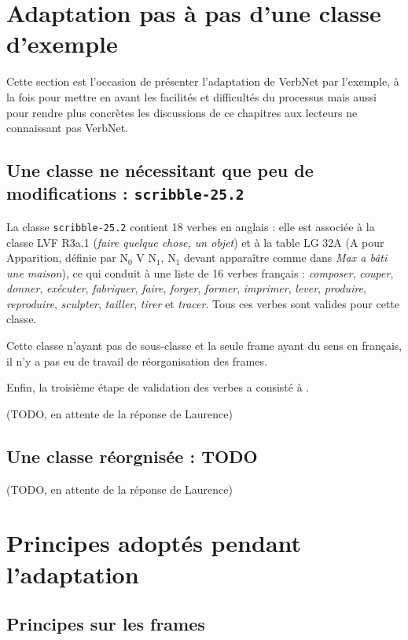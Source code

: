 \section{Adaptation pas à pas d'une classe d'exemple}

Cette section est l'occasion de présenter l'adaptation de VerbNet par
l'exemple, à la fois pour mettre en avant les facilités et difficultés du
processus mais aussi pour rendre plus concrètes les discussions de ce chapitres
aux lecteurs ne connaissant pas VerbNet.

\subsection{Une classe ne nécessitant que peu de modifications :
\texttt{scribble-25.2}}
\label{exemple_scribble}

La classe {\color{blue}\texttt{scribble-25.2}} contient 18 verbes en anglais :
elle est associée à la classe LVF {\color{red}R3a.1} (\textit{faire quelque
chose, un objet}) et à la table LG {\color{green}32A} (A pour Apparition,
définie par N$_0$ V N$_1$, N$_1$ devant apparaître comme dans \textit{Max a
bâti une maison}), ce qui conduit à une liste de 16 verbes français :
\textit{composer}, \textit{couper}, \textit{donner}, \textit{exécuter},
\textit{fabriquer}, \textit{faire}, \textit{forger}, \textit{former},
\textit{imprimer}, \textit{lever}, \textit{produire}, \textit{reproduire},
\textit{sculpter}, \textit{tailler}, \textit{tirer} et \textit{tracer}. Tous
ces verbes sont valides pour cette classe.

Cette classe n'ayant pas de sous-classe et la seule frame ayant du sens en
français, il n'y a pas eu de travail de réorganisation des frames.

Enfin, la troisième étape de validation des verbes a consisté à .

(TODO, en attente de la réponse de Laurence)

\subsection{Une classe réorgnisée : TODO}

(TODO, en attente de la réponse de Laurence)

\section{Principes adoptés pendant l'adaptation}

\subsection{Principes sur les frames}\label{princp}

